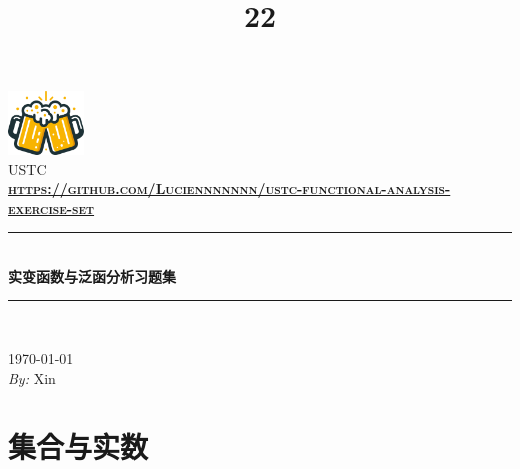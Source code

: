 \documentclass{article}
\title{22}
\newcommand{\HRule}{\rule{\linewidth}{0.5mm}}
\begin{document}
\begin{titlepage}

\begin{center}


\includegraphics[width=0.15\textwidth]{figures/Clinking Beer Mugs.pdf}\\[1cm]    

\textsc{\LARGE USTC}\\[1.5cm]

\textsc{\Large \textbf{\url{https://github.com/Luciennnnnnn/ustc-functional-analysis-exercise-set}}}\\[0.5cm]


\HRule \\[0.4cm]
{ \huge \bfseries 实变函数与泛函分析习题集}\\[0.4cm]

\HRule \\[1.5cm]

%

\vfill

{\large \today \\ \emph{By:} Xin}

\end{center}

\end{titlepage}





\section{集合与实数}
\end{document}
